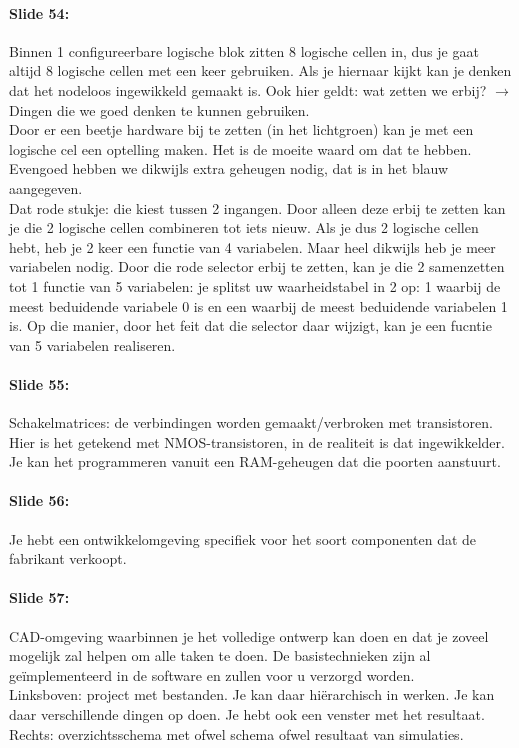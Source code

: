 \documentclass[10pt,a4paper]{book}
\begin{document}
\paragraph{Slide 54:} Binnen 1 configureerbare logische blok zitten 8 logische cellen in, dus je gaat altijd 8 logische cellen met een keer gebruiken. Als je hiernaar kijkt kan je denken dat het nodeloos ingewikkeld gemaakt is. Ook hier geldt: wat zetten we erbij? $\rightarrow$ Dingen die we goed denken te kunnen gebruiken. \\
Door er een beetje hardware bij te zetten (in het lichtgroen) kan je met een logische cel een optelling maken. Het is de moeite waard om dat te hebben.\\
Evengoed hebben we dikwijls extra geheugen nodig, dat is in het blauw aangegeven.\\
Dat rode stukje: die kiest tussen 2 ingangen. Door alleen deze erbij te zetten kan je die 2 logische cellen combineren tot iets nieuw. Als je dus 2 logische cellen hebt, heb je 2 keer een functie van 4 variabelen. Maar heel dikwijls heb je meer variabelen nodig. Door die rode selector erbij te zetten, kan je die 2 samenzetten tot 1 functie van 5 variabelen: je splitst uw waarheidstabel in 2 op: 1 waarbij de meest beduidende variabele 0 is en een waarbij de meest beduidende variabelen 1 is. Op die manier, door het feit dat die selector daar wijzigt, kan je een fucntie van 5 variabelen realiseren.

\paragraph{Slide 55:} Schakelmatrices: de verbindingen worden gemaakt/verbroken met transistoren.  Hier is het getekend met NMOS-transistoren, in de realiteit is dat ingewikkelder.  Je kan het programmeren vanuit een RAM-geheugen dat die poorten aanstuurt. 

\paragraph{Slide 56:} Je hebt een ontwikkelomgeving specifiek voor het soort componenten dat de fabrikant verkoopt.

\paragraph{Slide 57:} CAD-omgeving waarbinnen je het volledige ontwerp kan doen en dat je zoveel mogelijk zal helpen om alle taken te doen. De basistechnieken zijn al ge\"implementeerd in de software en zullen voor u verzorgd worden.\\
Linksboven: project met bestanden. Je kan daar hi\"erarchisch in werken. Je kan daar verschillende dingen op doen. Je hebt ook een venster met het resultaat. Rechts: overzichtsschema met ofwel schema ofwel resultaat van simulaties.
\end{document}
